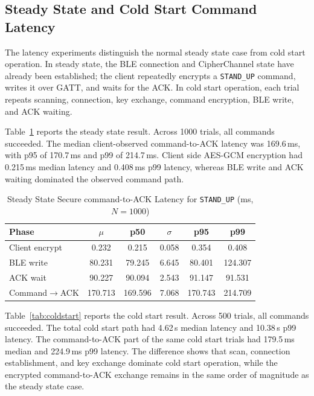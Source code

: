 \documentclass[journal]{IEEEtran}
\begin{document}
\subsection{Steady State and Cold Start Command Latency}

The latency experiments distinguish the normal steady state case from cold start operation. In steady state, the BLE connection and CipherChannel state have already been established; the client repeatedly encrypts a \texttt{STAND\_UP} command, writes it over GATT, and waits for the ACK. In cold start operation, each trial repeats scanning, connection, key exchange, command encryption, BLE write, and ACK waiting.

Table~\ref{tab:steady_latency} reports the steady state result. Across 1000 trials, all commands succeeded. The median client-observed command-to-ACK latency was 169.6\,ms, with p95 of 170.7\,ms and p99 of 214.7\,ms. Client side AES-GCM encryption had 0.215\,ms median latency and 0.408\,ms p99 latency, whereas BLE write and ACK waiting dominated the observed command path.

\begin{table}[!t]
\renewcommand{\arraystretch}{1.15}
\setlength{\tabcolsep}{4pt}
\caption{Steady State Secure command-to-ACK Latency for \texttt{STAND\_UP} (ms, $N=1000$)}
\label{tab:steady_latency}
\centering
\scriptsize
\begin{tabular}{@{} l ccccc @{}} 
\toprule
\textbf{Phase} & $\mu$ & \textbf{p50} & $\sigma$ & \textbf{p95} & \textbf{p99} \\
\midrule
Client encrypt & 0.232 & 0.215 & 0.058 & 0.354 & 0.408 \\
BLE write & 80.231 & 79.245 & 6.645 & 80.401 & 124.307 \\
ACK wait & 90.227 & 90.094 & 2.543 & 91.147 & 91.531 \\
Command$\rightarrow$ACK & 170.713 & 169.596 & 7.068 & 170.743 & 214.709 \\
\bottomrule
\end{tabular}
\end{table}

Table~\ref{tab:coldstart} reports the cold start result. Across 500 trials, all commands succeeded. The total cold start path had 4.62\,s median latency and 10.38\,s p99 latency. The command-to-ACK part of the same cold start trials had 179.5\,ms median and 224.9\,ms p99 latency. The difference shows that scan, connection establishment, and key exchange dominate cold start operation, while the encrypted command-to-ACK exchange remains in the same order of magnitude as the steady state case.
\end{document}
